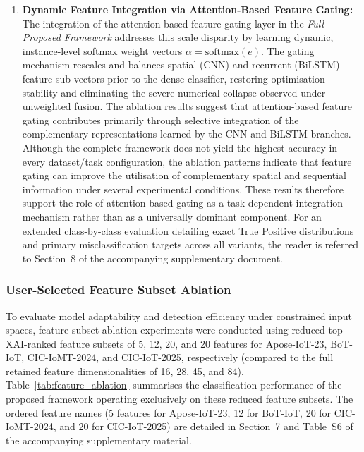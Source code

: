 \documentclass[a4paper,fleqn]{cas-sc}
\begin{document}
\begin{enumerate}
    \item \textbf{Dynamic Feature Integration via Attention-Based Feature Gating:} The integration of the attention-based feature-gating layer in the \textit{Full Proposed Framework} addresses this scale disparity by learning dynamic, instance-level softmax weight vectors $\alpha = \text{softmax}(e)$. The gating mechanism rescales and balances spatial (CNN) and recurrent (BiLSTM) feature sub-vectors prior to the dense classifier, restoring optimisation stability and eliminating the severe numerical collapse observed under unweighted fusion. The ablation results suggest that attention-based feature gating contributes primarily through selective integration of the complementary representations learned by the CNN and BiLSTM branches. Although the complete framework does not yield the highest accuracy in every dataset/task configuration, the ablation patterns indicate that feature gating can improve the utilisation of complementary spatial and sequential information under several experimental conditions. These results therefore support the role of attention-based gating as a task-dependent integration mechanism rather than as a universally dominant component. For an extended class-by-class evaluation detailing exact True Positive distributions and primary misclassification targets across all variants, the reader is referred to Section~8 of the accompanying supplementary document.
\end{enumerate}

\subsubsection{User-Selected Feature Subset Ablation} \label{sec:feature_ablation}
To evaluate model adaptability and detection efficiency under constrained input spaces, feature subset ablation experiments were conducted using reduced top XAI-ranked feature subsets of 5, 12, 20, and 20 features for Apose-IoT-23, BoT-IoT, CIC-IoMT-2024, and CIC-IoT-2025, respectively (compared to the full retained feature dimensionalities of 16, 28, 45, and 84). Table~\ref{tab:feature_ablation} summarises the classification performance of the proposed framework operating exclusively on these reduced feature subsets. The ordered feature names (5 features for Apose-IoT-23, 12 for BoT-IoT, 20 for CIC-IoMT-2024, and 20 for CIC-IoT-2025) are detailed in Section~7 and Table~S6 of the accompanying supplementary material.
\end{document}
